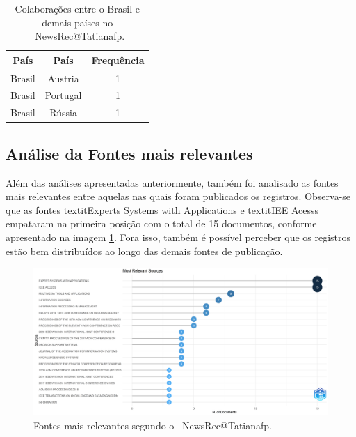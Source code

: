 \begin{center}
\begin{table}[h]
\begin{tabular}{||c c c||} 
 \hline
 País & País & Frequência \\ 
 \hline\hline
 Brasil & Austria & 1 \\ 
 \hline
 Brasil & Portugal & 1 \\
 \hline
 Brasil & Rússia & 1  \\ \hline
\end{tabular}
 \caption{Colaborações entre o Brasil e demais países no \dataset\ NewsRec@Tatianafp.}
\label{tab:Brasil_collab_Tatianafp}
\end{table}
\end{center}

\subsection{Análise da Fontes mais relevantes }

Além das análises apresentadas anteriormente, também foi analisado as fontes mais relevantes entre aquelas nas quais foram publicados os registros. Observa-se que as fontes textit{Experts Systems with Applications} e textit{IEE Acesss} empataram na primeira posição com o total de 15 documentos, conforme apresentado na imagem \ref{tab:Brasil_collab_Tatianafp}. Fora isso, também é possível perceber que os registros estão bem distribuídos ao longo das demais fontes de publicação. 

\begin{figure}
    \centering
    \includegraphics[width=1\textwidth]{experiments/Tatianafp/PesquisaBibliometrica/images/MostRelevantSources.png}
    \caption{Fontes mais relevantes segundo o \dataset\ NewsRec@Tatianafp.}
    \label{fig:relevant_sources_NewsRec_Tatianafp}
\end{figure}


